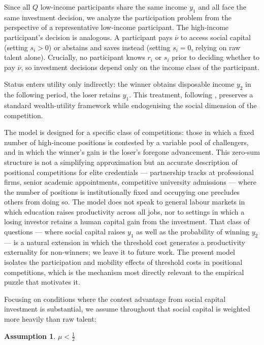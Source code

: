 \documentclass[
    oneside,
    fontsize=10pt,leqno]{article}
\newtheorem{assumption}{Assumption}
\begin{document}
Since all $Q$ low-income participants share the same income $y_{1}$ and
all face the same investment decision, we analyze the participation
problem from the perspective of a representative low-income participant.
The high-income participant's decision is analogous. A participant pays
$\overline{\nu}$ to access social capital (setting $s_{i}>0$) or
abstains and saves instead (setting $s_{i}=0$, relying on raw talent
alone). Crucially, no participant knows $r_{i}$ or $s_{i}$ prior
to deciding whether to pay $\overline{\nu}$, so investment decisions
depend only on the income class of the participant.

Status enters utility only indirectly: the winner obtains disposable
income $y_{2}$ in the following period, the loser retains $y_{1}$.
This treatment, following \citet{postlewaite1998socialbasisinterdeppreferences},
preserves a standard wealth-utility framework while endogenising the
social dimension of the competition.

The model is designed for a specific class of competitions: those
in which a fixed number of high-income positions is contested by a
variable pool of challengers, and in which the winner's gain is
the loser's foregone advancement. This zero-sum structure is not
a simplifying approximation but an accurate description of
positional competitions for elite credentials --- partnership
tracks at professional firms, senior academic appointments,
competitive university admissions --- where the number of positions
is institutionally fixed and occupying one precludes others from
doing so. The model does not speak to general labour markets in
which education raises productivity across all jobs, nor to settings
in which a losing investor retains a human capital gain from the
investment. That class of questions --- where social capital raises
$y_1$ as well as the probability of winning $y_2$ --- is a natural
extension in which the threshold cost generates a productivity
externality for non-winners; we leave it to future work. The
present model isolates the participation and mobility effects of
threshold costs in positional competitions, which is the mechanism
most directly relevant to the empirical puzzle that motivates it.

Focusing on conditions where the contest advantage from social capital
investment is substantial, we assume
throughout that social capital is weighted more heavily than raw talent:

\begin{assumption}
\label{assu:mu_less_than_half}$\mu<\frac{1}{2}$
\end{assumption}
\end{document}
